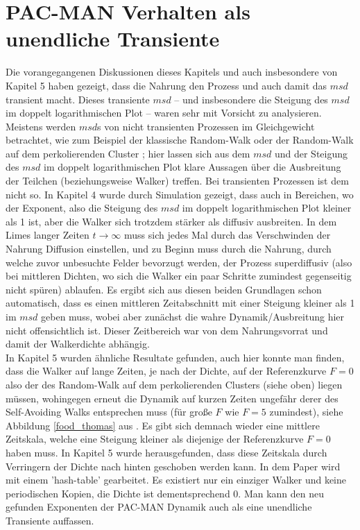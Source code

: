 \documentclass[a4paper, 12pt]{report}
\begin{document}
\section{PAC-MAN Verhalten als unendliche Transiente}
Die vorangegangenen Diskussionen dieses Kapitels und auch insbesondere von Kapitel 5 haben gezeigt, dass die Nahrung den Prozess und auch damit das $msd$ transient macht. Dieses transiente $msd$ -- und insbesondere die Steigung des $msd$ im doppelt logarithmischen Plot -- waren sehr mit Vorsicht zu analysieren. 
\\
Meistens werden $msd$s von nicht transienten Prozessen im Gleichgewicht betrachtet, wie zum Beispiel der klassische Random-Walk oder der Random-Walk auf dem perkolierenden Cluster \cite{PhysRevLett.50.77}; hier lassen sich aus dem $msd$ und der Steigung des $msd$ im doppelt logarithmischen Plot klare Aussagen über die Ausbreitung der Teilchen (beziehungsweise Walker) treffen. Bei transienten Prozessen ist dem nicht so. In Kapitel 4 wurde durch Simulation gezeigt, dass auch in Bereichen, wo der Exponent, also die Steigung des $msd$ im doppelt logarithmischen Plot kleiner als 1 ist, aber die Walker sich trotzdem stärker als diffusiv ausbreiten. In dem Limes langer Zeiten $t \rightarrow \infty$ muss sich jedes Mal durch das Verschwinden der Nahrung Diffusion einstellen, und zu Beginn muss durch die Nahrung, durch welche zuvor unbesuchte Felder bevorzugt werden, der Prozess superdiffusiv (also bei mittleren Dichten, wo sich die Walker ein paar Schritte zumindest gegenseitig nicht spüren) ablaufen. Es ergibt sich aus diesen beiden Grundlagen schon automatisch, dass es einen mittleren Zeitabschnitt mit einer Steigung kleiner als 1 im $msd$ geben muss, wobei aber zunächst die wahre Dynamik/Ausbreitung hier nicht offensichtlich ist. Dieser Zeitbereich war von dem Nahrungsvorrat und damit der Walkerdichte abhängig.
\\
In Kapitel 5 wurden ähnliche Resultate gefunden, auch hier konnte man finden, dass die Walker auf lange Zeiten, je nach der Dichte, auf der Referenzkurve $F=0$ also der des Random-Walk auf dem perkolierenden Clusters (siehe oben) liegen müssen, wohingegen erneut die Dynamik auf kurzen Zeiten ungefähr derer des Self-Avoiding Walks entsprechen muss (für große $F$ wie $F=5$ zumindest), siehe Abbildung \ref{food_thomas} aus \cite{doi:10.1063/1.4999485}. Es gibt sich demnach wieder eine mittlere Zeitskala, welche eine Steigung kleiner als diejenige der Referenzkurve $F=0$ haben muss. In Kapitel 5 wurde herausgefunden, dass diese Zeitskala durch Verringern der Dichte nach hinten geschoben werden kann. In dem Paper \cite{doi:10.1063/1.4999485} wird mit einem 'hash-table' gearbeitet. Es existiert nur ein einziger Walker und keine periodischen Kopien, die Dichte ist dementsprechend 0. Man kann den neu gefunden Exponenten der PAC-MAN Dynamik auch als eine unendliche Transiente auffassen.
\end{document}
